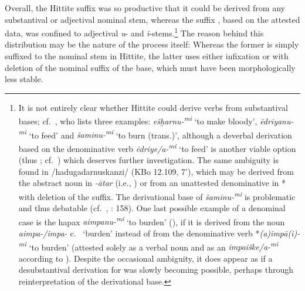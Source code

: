 \documentclass[output=paper,colorlinks,citecolor=brown]{langscibook}
\begin{document}
Overall, the Hittite  suffix  was so productive that it could be derived from any substantival or adjectival nominal stem, whereas the  suffix , based on the attested data, was confined to adjectival \textit{u}- and \textit{i}-stems.\footnote{It is not entirely clear whether Hittite  could derive verbs from substantival bases; cf.\ \citealt[71]{Vanseveren2014}, who lists three examples: \textit{ešḫarnu-\textsuperscript{mi}} ‘to make bloody’, \textit{ēdriyanu-\textsuperscript{mi}} ‘to feed’ and \textit{šaminu-\textsuperscript{mi}} ‘to burn (trans.)’, although a deverbal derivation based on the denominative verb  \textit{ēdriye/a-\textsuperscript{mi}} ‘to feed’ is another viable option (thus \citealt[175, fn.\ 10]{HoffnerMelchert2008}; cf.\ \citealt[155]{Luraghi1992}) which deserves further investigation. The same ambiguity is found in  /hadugadarnuskanzi/ (KBo 12.109, 7'), which may be derived from the abstract noun in \textit{-ātar} (i.e., ) or from an unattested denominative in * with deletion of the suffix. The derivational base of \textit{šaminu-\textsuperscript{mi}} is problematic and thus debatable (cf.\ , \citealt{Luraghi1992}: 158). One last possible example of a denominal case is the hapax \textit{aimpanu\nobreakdash-\textsuperscript{mi}} ‘to burden’ (), if it is derived from the noun \textit{aimpa-/impa-} c.\  ‘burden’ instead of from the denominative verb *\textit{(a)impā(i)-\textsuperscript{mi}} ‘to burden’ (attested solely as a verbal noun  and as an  \textit{impaiške/a-\textsuperscript{mi}} according to ). Despite the occasional ambiguity, it does appear as if a desubstantival derivation for  was slowly becoming possible, perhaps through reinterpretation of the derivational base.} The reason behind this distribution may be the nature of the process itself: Whereas the former is simply suffixed to the nominal stem in Hittite, the latter uses either infixation or  with deletion of the nominal suffix of the base, which must have been morphologically less stable.
\end{document}
